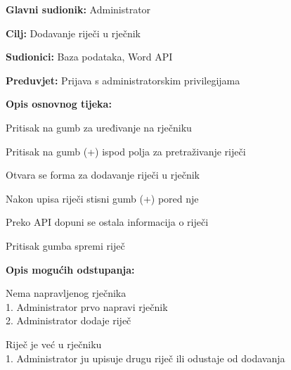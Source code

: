 					\noindent {}
					\begin{packed_item}
						\item \textbf{Glavni sudionik:} Administrator
						\item \textbf{Cilj:} Dodavanje riječi u rječnik
						\item \textbf{Sudionici:} Baza podataka, Word API
						\item \textbf{Preduvjet:} Prijava s administratorskim privilegijama
						\item \textbf{Opis osnovnog tijeka:}
						\begin{packed_enum}
							\item Pritisak na gumb za uređivanje na rječniku
							\item Pritisak na gumb (+) ispod polja za pretraživanje riječi
							\item Otvara se forma za dodavanje riječi u rječnik
							\item Nakon upisa riječi stisni gumb (+) pored nje
							\item Preko API dopuni se ostala informacija o riječi
							\item Pritisak gumba spremi riječ
						\end{packed_enum}
						\item \textbf{Opis mogućih odstupanja:}
						\begin{packed_item}
							\item [1.a] Nema napravljenog rječnika
							\\1. Administrator prvo napravi rječnik
							\\2. Administrator dodaje riječ
							\item [6.a] Riječ je već u rječniku
							\\1. Administrator ju upisuje drugu riječ ili odustaje od dodavanja
						\end{packed_item}
					\end{packed_item}

